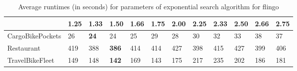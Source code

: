 \begin{table}[ht]
\centering
\caption{Average runtimes (in seconds) for  parameters of exponential search algorithm for flingo}
\label{tab:results:exponential}
\begin{tabular}{l|lllllllllll}
\toprule
 & 1.25 & 1.33 & 1.50 & 1.66 & 1.75 & 2.00 & 2.25 & 2.33 & 2.50 & 2.66 & 2.75 \\
\midrule
CargoBikePockets & 26 & \textbf{24} & 24 & 25 & 29 & 28 & 30 & 32 & 33 & 38 & 37 \\
\cline{1-12}
Restaurant & 419 & 388 & \textbf{386} & 414 & 414 & 427 & 398 & 415 & 427 & 399 & 406 \\
\cline{1-12}
TravelBikeFleet & 149 & 148 & \textbf{142} & 169 & 143 & 175 & 217 & 235 & 202 & 186 & 181 \\
\cline{1-12}
\bottomrule
\end{tabular}
\end{table}
